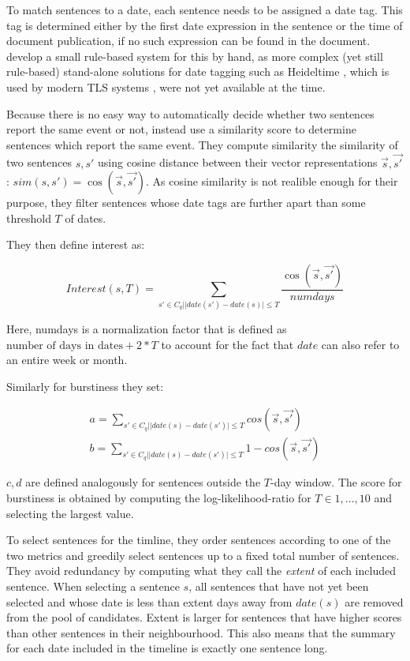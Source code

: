 \documentclass[a4paper,BCOR=10mm]{report}
\numberwithin{lemma}{chapter}
\numberwithin{definition}{chapter}
\begin{document}
To match sentences to a date, each sentence needs to be assigned a date tag. This tag is determined either by the first date expression in the sentence or the time of document publication, if no such expression can be found in the document. \citeauthor{chieu} develop a small rule-based system for this by hand, as more complex (yet still rule-based) stand-alone solutions for date tagging such as Heideltime \citep{heideltime}, which is used by modern TLS systems \citep{tran-headlines, markert}, were not yet available at the time.


Because there is no easy way to automatically decide whether two sentences report the same event or not, \citeauthor{chieu} instead use a similarity score to determine sentences which report the same event. They compute similarity the similarity of two sentences $s, s'$ using cosine distance between their vector representations $\vec{s}, \vec{s'}$: $\mathit{sim}(s, s') = \cos(\vec{s}, \vec{s'})$.
As cosine similarity is not realible enough for their purpose, they filter sentences whose date tags are further apart than some threshold $T$ of dates.

They then define interest as:

\begin{equation}
\mathit{Interest}(s, T) = \sum_{s' \in C_q | |\mathit{date}(s') - \mathit{date}(s)| \leq T} \frac{\cos(\vec{s}, \vec{s'})}{\mathit{numdays}}
\end{equation}

Here, numdays is a normalization factor that is defined as $\text{number of days in dates} + 2 * T$ to account for the fact that $\mathit{date}$ can also refer to an entire week or month.

Similarly for burstiness they set:

\begin{align}
a = \sum_{s' \in C_q | |\mathit{date}(s) - \mathit{date}(s')| \leq T} \mathit{cos}(\vec{s}, \vec{s'}) \\
b = \sum_{s' \in C_q | |\mathit{date}(s) - \mathit{date}(s')| \leq T} 1 - \mathit{cos}(\vec{s}, \vec{s'})
\end{align}

$c, d$ are defined analogously for sentences outside the $T$-day window. The score for burstiness is obtained by computing the log-likelihood-ratio for $T \in 1, ..., 10$ and selecting the largest value.

To select sentences for the timline, they order sentences according to one of the two metrics and greedily select sentences up to a fixed total number of sentences.
They avoid redundancy by computing what they call the \textit{extent} of each included sentence. When selecting a sentence $s$, all sentences that have not yet been selected and whose date is less than extent days away from $\mathit{date}(s)$ are removed from the pool of candidates. Extent is larger for sentences that have higher scores than other sentences in their neighbourhood.
This also means that the summary for each date included in the timeline is exactly one sentence long.
\end{document}
